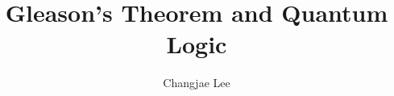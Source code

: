 \usepackage[11pt]{report}
\usepackage{geometry}
\geometry{
    a4paper
}

\title{Gleason's Theorem and Quantum Logic}
\author{Changjae Lee}





